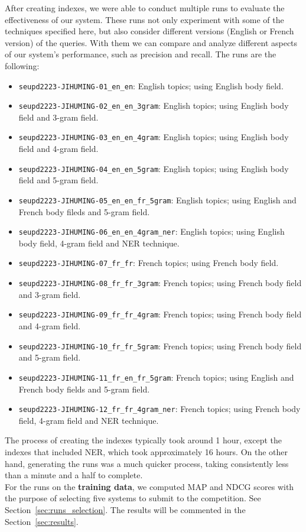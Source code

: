 After creating indexes, we were able to conduct multiple runs to evaluate the effectiveness of our system.
These runs not only experiment with some of the techniques specified here, but also consider different versions (English
or French version) of the queries.
With them we can compare and analyze different aspects of our system's performance, such as precision and recall.
The runs are the following:
\begin{itemize}
	\item \texttt{seupd2223-JIHUMING-01\_en\_en}: English topics; using English body field.
	\item \texttt{seupd2223-JIHUMING-02\_en\_en\_3gram}: English topics; using English body field and 3-gram field.
	\item \texttt{seupd2223-JIHUMING-03\_en\_en\_4gram}: English topics; using English body field and 4-gram field.
	\item \texttt{seupd2223-JIHUMING-04\_en\_en\_5gram}: English topics; using English body field and 5-gram field.
	\item \texttt{seupd2223-JIHUMING-05\_en\_en\_fr\_5gram}: English topics; using English and French body fileds and 5-gram field.
	\item \texttt{seupd2223-JIHUMING-06\_en\_en\_4gram\_ner}: English topics; using English body field, 4-gram field and NER technique.
	\item \texttt{seupd2223-JIHUMING-07\_fr\_fr}: French topics; using French body field.
	\item \texttt{seupd2223-JIHUMING-08\_fr\_fr\_3gram}: French topics; using French body field and 3-gram field.
	\item \texttt{seupd2223-JIHUMING-09\_fr\_fr\_4gram}: French topics; using French body field and 4-gram field.
	\item \texttt{seupd2223-JIHUMING-10\_fr\_fr\_5gram}: French topics; using French body field and 5-gram field.
	\item \texttt{seupd2223-JIHUMING-11\_fr\_en\_fr\_5gram}: French topics; using English and French body fields and 5-gram field.
	\item \texttt{seupd2223-JIHUMING-12\_fr\_fr\_4gram\_ner}: French topics; using French body field, 4-gram field and NER technique.
\end{itemize}

The process of creating the indexes typically took around 1 hour, except the indexes that included NER, which took
approximately 16 hours.
On the other hand, generating the runs was a much quicker process, taking consistently less than a minute and a half to
complete.\\

For the runs on the \textbf{training data}, we computed MAP and NDCG scores with the purpose of selecting five systems
to submit to the competition.
See Section~\ref{sec:runs_selection}.
The results will be commented in the Section~\ref{sec:results}.